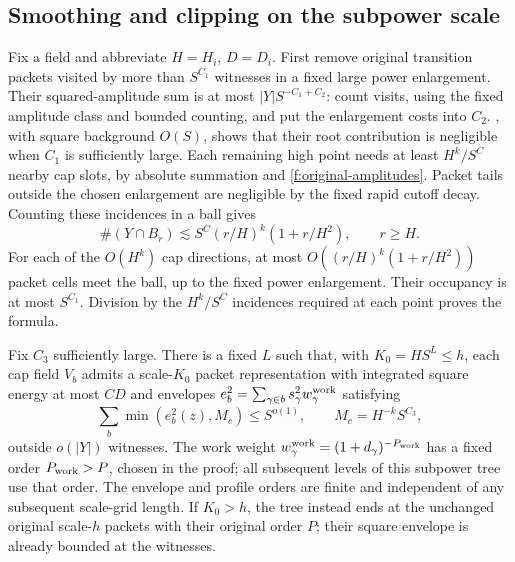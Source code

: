 \subsection{Smoothing and clipping on the subpower scale}

Fix a field and abbreviate $H=H_i$, $D=D_i$. First remove original
transition packets visited by more than $S^{C_1}$ witnesses in a fixed
large power enlargement. Their squared-amplitude sum is at most
$|Y|S^{-C_1+C_2}$: count visits, using the fixed amplitude class and
bounded counting, and put the enlargement costs into $C_2$.
, with square background $O(S)$, shows that
their root contribution is negligible when $C_1$ is sufficiently large.
Each remaining high point needs at least $H^k/S^C$ nearby cap slots,
by absolute summation and \eqref{f:original-amplitudes}. Packet tails
outside the chosen enlargement are negligible by the fixed rapid
cutoff decay. Counting these incidences in a ball gives
\begin{equation}\label{f:ballcount}
 \#(Y\cap B_r)\lesssim S^C(r/H)^k(1+r/H^2),\qquad r\ge H.
\end{equation}
For each of the $O(H^k)$ cap directions, at most
$O((r/H)^k(1+r/H^2))$ packet cells meet the ball, up to the fixed power
enlargement. Their occupancy is at most $S^{C_1}$. Division by the
$H^k/S^C$ incidences required at each point proves the formula.

\begin{lemma}\label{f:smoothing}
Fix $C_3$ sufficiently large. There is a fixed $L$ such that, with
$K_0=HS^L\le h$, each cap field $V_b$ admits a scale-$K_0$ packet
representation with integrated square energy at most $CD$ and
envelopes
$e_b^2=\sum_{\gamma\in b}s_\gamma^2w_\gamma^{\rm work}$ satisfying
\begin{equation}\label{f:clipped}
 \sum_b\min(e_b^2(z),M_c)\le S^{o(1)},
 \qquad M_c=H^{-k}S^{C_3},
\end{equation}
outside $o(|Y|)$ witnesses. The work weight
$w_\gamma^{\rm work}=(1+d_\gamma)^{-P_{\rm work}}$ has a fixed order
$P_{\rm work}>P$, chosen in the proof; all subsequent levels of this
subpower tree use that order. The envelope and profile orders are
finite and independent of any subsequent scale-grid length. If
$K_0>h$, the tree instead ends at the unchanged original scale-$h$
packets with their original order $P$; their square envelope is
already bounded at the witnesses.
\end{lemma}

